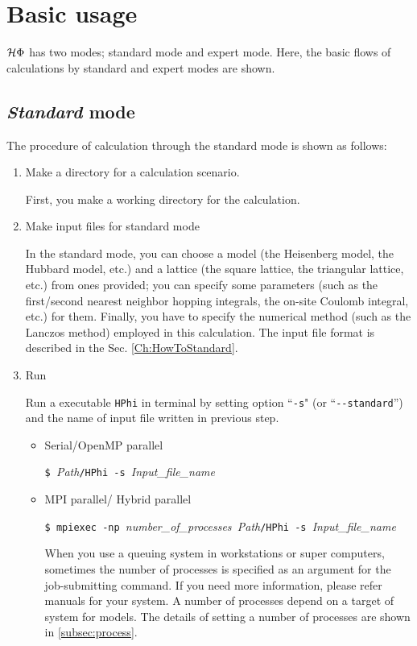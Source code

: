 \section{Basic usage}
$\mathcal{H} \Phi$ has two modes; standard mode and expert mode. Here, the basic flows of calculations by standard and expert modes are shown.

\subsection{{\it Standard} mode}

The procedure of calculation through the standard mode is shown as follows:

\begin{enumerate}

\item  Make a directory for a calculation scenario. 

First, you make a working directory for the calculation.

\item  Make input files for standard mode

In the standard mode, you can choose a model (the Heisenberg model, the Hubbard model, etc.) and 
a lattice (the square lattice, the triangular lattice, etc.) from ones provided;
you can specify some parameters (such as the first/second nearest neighbor hopping integrals,
the on-site Coulomb integral, etc.) for them.
Finally, you have to specify the numerical method (such as the Lanczos method) employed in this calculation.
The input file format is described in the Sec. \ref{Ch:HowToStandard}.

\item  Run

Run a executable \verb|HPhi| in terminal by setting option ``\verb|-s|" (or ``\verb|--standard|'') and the name of input file written in previous step.

\begin{itemize}

\item Serial/OpenMP parallel

  \verb|$ |\textit{Path}\verb|/HPhi -s |\textit{Input\_file\_name}

\item MPI parallel/ Hybrid parallel

  \verb|$ mpiexec -np |\textit{number\_of\_processes}\verb| |\textit{Path}\verb|/HPhi -s |\textit{Input\_file\_name}

  When you use a queuing system in workstations or super computers, 
  sometimes the number of processes is specified as an argument for the job-submitting command.
  If you need more information, please refer manuals for your system. 
 A number of processes depend on a target of system for models. The details of setting a number of processes are shown in  \ref{subsec:process}.
\end{itemize}


\end{enumerate}

